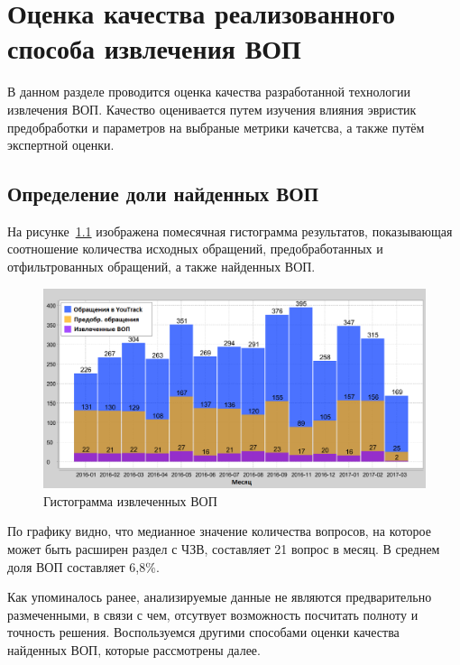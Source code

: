 \chapter{Оценка качества реализованного способа извлечения ВОП}
\label{chap:quality}

В данном разделе проводится оценка качества разработанной технологии извлечения ВОП. Качество оценивается путем изучения влияния эвристик предобработки и параметров на выбраные метрики качетсва, а также путём экспертной оценки.

\section{Определение доли найденных ВОП}

На рисунке~\ref{fig:tickets_distr} изображена помесячная гистограмма результатов, показывающая соотношение количества исходных обращений, предобработанных и отфильтрованных обращений, а также найденных ВОП. 

\begin{figure}[tph!]
\centerline{\includegraphics[width=11.5cm]{fig/tickets_distr.png}}
    \caption{Гистограмма извлеченных ВОП}
    \label{fig:tickets_distr}
\end{figure}

По графику видно, что медианное значение количества вопросов, на которое может быть расширен раздел с ЧЗВ, составляет 21 вопрос в месяц. В среднем доля ВОП составляет 6,8\%.

Как упоминалось ранее, анализируемые данные не являются предварительно размеченными, в связи с чем, отсутвует возможность посчитать полноту и точность решения. Воспользуемся другими способами оценки качества найденных ВОП, которые рассмотрены далее.

